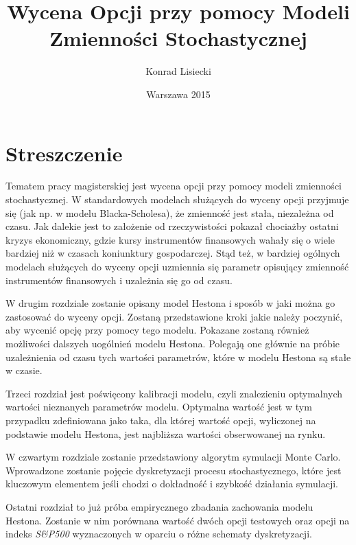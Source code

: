 \documentclass{pracamgr}
\author{Konrad Lisiecki}
\title{Wycena Opcji przy pomocy Modeli Zmienności Stochastycznej}
\date{Warszawa 2015}
\begin{document}
\maketitle

\cleardoublepage
{}
\chapter*{Streszczenie} 
 


Tematem pracy magisterskiej jest wycena opcji przy pomocy modeli zmienności stochastycznej. 
W standardowych modelach służących do wyceny opcji przyjmuje się (jak np. w modelu 
Blacka-Scholesa), że zmienność jest stała, niezależna od czasu. 
Jak dalekie jest to założenie od rzeczywistości pokazał chociażby ostatni kryzys 
ekonomiczny, gdzie kursy instrumentów finansowych wahały się o wiele bardziej niż w czasach
koniunktury gospodarczej. Stąd też, w bardziej ogólnych modelach służących do wyceny opcji uzmiennia 
się parametr opisujący zmienność instrumentów finansowych i uzależnia się go od czasu. 

W drugim rozdziale zostanie opisany model Hestona i sposób w jaki można go zastosować do wyceny 
opcji. Zostaną przedstawione kroki jakie należy poczynić, aby wycenić opcję przy pomocy tego modelu.
Pokazane zostaną również możliwości dalszych uogólnień modelu Hestona. 
Polegają one głównie na próbie uzależnienia od czasu tych wartości parametrów, które w 
modelu Hestona są stałe w czasie.

Trzeci rozdział jest poświęcony kalibracji modelu, czyli znalezieniu 
optymalnych wartości nieznanych parametrów modelu. Optymalna wartość jest w tym przypadku zdefiniowana
jako taka, dla której wartość opcji, wyliczonej na podstawie modelu Hestona, jest najbliższa wartości 
obserwowanej na rynku.

W czwartym rozdziale zostanie przedstawiony algorytm symulacji Monte Carlo. 
Wprowadzone zostanie pojęcie dyskretyzacji procesu stochastycznego, które jest kluczowym elementem
jeśli chodzi o dokładność i szybkość działania symulacji. 


Ostatni rozdział to już próba empirycznego zbadania zachowania modelu Hestona. Zostanie w nim 
porównana wartość dwóch opcji testowych oraz opcji na indeks \textit{S\&P500} wyznaczonych w oparciu o  
różne schematy dyskretyzacji.
\end{document}
